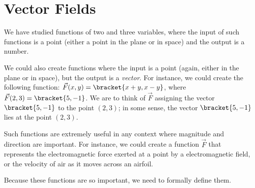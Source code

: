 \section{Vector Fields}\label{sec:vector_fields}

We have studied functions of two and three variables, where the input of such functions is a point (either a point in the plane or in space) and the output is a number.

We could also create functions where the input is a point (again, either in the plane or in space), but the output is a \emph{vector}. For instance, we could create the following function: $\vec F(x,y) =\bracket{x+y, x-y}$, where $\vec F(2,3) =\bracket{5,-1}$. We are to think of $\vec F$ assigning the vector $\bracket{5,-1}$ to the point $(2,3)$; in some sense, the vector $\bracket{5,-1}$ lies at the point $(2,3)$. 

Such functions are extremely useful in any context where magnitude and direction are important. For instance, we could create a function $\vec F$ that represents the electromagnetic force exerted at a point by a electromagnetic field, or the velocity of air as it moves across an airfoil. 

Because these functions are so important, we need to formally define them.

